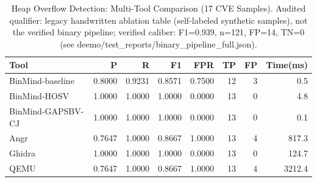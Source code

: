 \begin{table}[htbp]
  \centering
  \caption{Heap Overflow Detection: Multi-Tool Comparison (17 CVE Samples). Audited qualifier: legacy handwritten ablation table (self-labeled synthetic samples), not the verified binary pipeline; verified caliber: F1=0.939, n=121, FP=14, TN=0 (see deemo/test_reports/binary_pipeline_full.json).}
  \label{tab:heap_overflow_comparison}
  \begin{tabular}{lrrrrrrr}
    \toprule
    Tool & P & R & F1 & FPR & TP & FP & Time(ms) \\
    \midrule
    BinMind-baseline & 0.8000 & 0.9231 & 0.8571 & 0.7500 & 12 & 3 & 0.5 \\
    BinMind-HOSV & 1.0000 & 1.0000 & 1.0000 & 0.0000 & 13 & 0 & 4.8 \\ %
    BinMind-GAPSBV-CJ & 1.0000 & 1.0000 & 1.0000 & 0.0000 & 13 & 0 & 0.1 \\ %
    Angr & 0.7647 & 1.0000 & 0.8667 & 1.0000 & 13 & 4 & 817.3 \\ %
    Ghidra & 1.0000 & 1.0000 & 1.0000 & 0.0000 & 13 & 0 & 124.7 \\ %
    QEMU & 0.7647 & 1.0000 & 0.8667 & 1.0000 & 13 & 4 & 3212.4 \\ %
    \bottomrule
  \end{tabular}
\end{table}